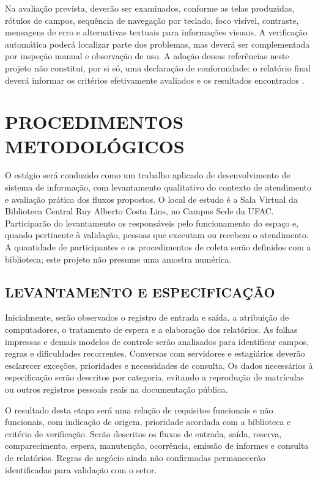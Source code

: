 \documentclass[12pt,a4paper]{article}
\newcommand{\secao}[1]{\clearpage\section{#1}}
\begin{document}
Na avaliação prevista, deverão ser examinados, conforme as telas produzidas, rótulos de campos, sequência de navegação por teclado, foco visível, contraste, mensagens de erro e alternativas textuais para informações visuais. A verificação automática poderá localizar parte dos problemas, mas deverá ser complementada por inspeção manual e observação de uso. A adoção dessas referências neste projeto não constitui, por si só, uma declaração de conformidade: o relatório final deverá informar os critérios efetivamente avaliados e os resultados encontrados \cite{emag2014,wcag22_2024}.

\secao{PROCEDIMENTOS METODOLÓGICOS}

O estágio será conduzido como um trabalho aplicado de desenvolvimento de sistema de informação, com levantamento qualitativo do contexto de atendimento e avaliação prática dos fluxos propostos. O local de estudo é a Sala Virtual da Biblioteca Central Ruy Alberto Costa Lins, no Campus Sede da UFAC. Participarão do levantamento os responsáveis pelo funcionamento do espaço e, quando pertinente à validação, pessoas que executam ou recebem o atendimento. A quantidade de participantes e os procedimentos de coleta serão definidos com a biblioteca; este projeto não presume uma amostra numérica.

\subsection{LEVANTAMENTO E ESPECIFICAÇÃO}

Inicialmente, serão observados o registro de entrada e saída, a atribuição de computadores, o tratamento de espera e a elaboração dos relatórios. As folhas impressas e demais modelos de controle serão analisados para identificar campos, regras e dificuldades recorrentes. Conversas com servidores e estagiários deverão esclarecer exceções, prioridades e necessidades de consulta. Os dados necessários à especificação serão descritos por categoria, evitando a reprodução de matrículas ou outros registros pessoais reais na documentação pública.

O resultado desta etapa será uma relação de requisitos funcionais e não funcionais, com indicação de origem, prioridade acordada com a biblioteca e critério de verificação. Serão descritos os fluxos de entrada, saída, reserva, comparecimento, espera, manutenção, ocorrência, emissão de informes e consulta de relatórios. Regras de negócio ainda não confirmadas permanecerão identificadas para validação com o setor.
\end{document}
